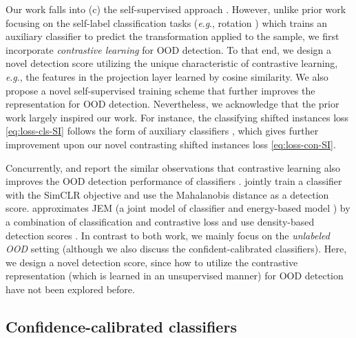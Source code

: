 \documentclass{article}
\newcommand{\eg}{\textit{e}.\textit{g}.}
\begin{document}
Our work falls into (c) the self-supervised approach \citep{golan2018deep,hendrycks2019using_self,bergman2020classification}. However, unlike prior work focusing on the self-label classification tasks (\eg, rotation \citep{gidaris2018unsupervised}) which trains an auxiliary classifier to predict the transformation applied to the sample, we first incorporate \textit{contrastive learning} \citep{chen2020simple} for OOD detection. To that end, we design a novel detection score utilizing the unique characteristic of contrastive learning, \eg, the features in the projection layer learned by cosine similarity. We also propose a novel self-supervised training scheme that further improves the representation for OOD detection. Nevertheless, we acknowledge that the prior work largely inspired our work. For instance, the classifying shifted instances loss \eqref{eq:loss-cls-SI} follows the form of auxiliary classifiers \citep{hendrycks2019using_self}, which gives further improvement upon our novel contrasting shifted instances loss \eqref{eq:loss-con-SI}.

Concurrently, \citet{winkens2020contrastive} and \citet{liu2020hybrid} report the similar observations that contrastive learning also improves the OOD detection performance of classifiers \citep{liang2018enhancing,lee2018simple,hendrycks2019using_self}. \citet{winkens2020contrastive} jointly train a classifier with the SimCLR \citep{chen2020simple} objective and use the Mahalanobis distance \citep{lee2018simple} as a detection score. \citet{liu2020hybrid} approximates JEM \citep{grathwohl2020your} (a joint model of classifier and energy-based model \citep{du2019implicit}) by a combination of classification and contrastive loss and use density-based detection scores \citep{grathwohl2020your}. In contrast to both work, we mainly focus on the \textit{unlabeled OOD} setting (although we also discuss the confident-calibrated classifiers). Here, we design a novel detection score, since how to utilize the contrastive representation (which is learned in an unsupervised manner) for OOD detection have not been explored before.


\subsection{Confidence-calibrated classifiers}
\end{document}
